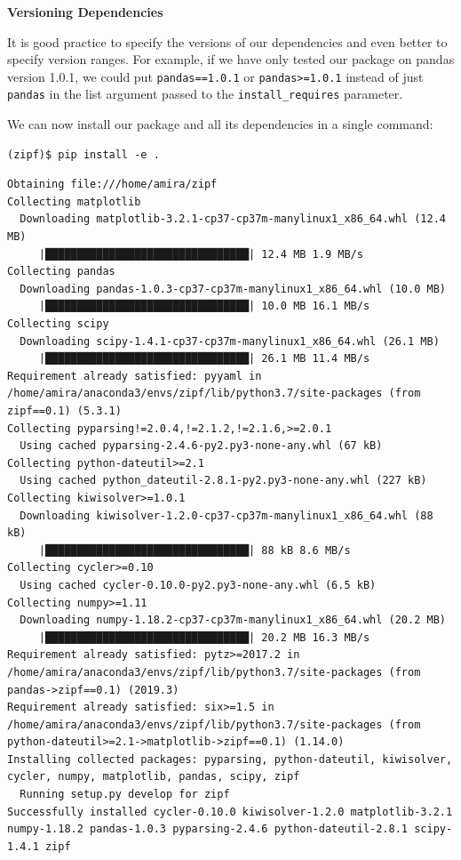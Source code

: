 \documentclass[
]{krantz}
\renewenvironment{quote}{\begin{VF}}{\end{VF}}
\begin{document}
\begin{quote}
\textbf{Versioning Dependencies}

It is good practice to specify the versions of our dependencies
and even better to specify version ranges.
For example, if we have only tested our package on pandas version 1.0.1,
we could put \texttt{pandas==1.0.1} or \texttt{pandas\textgreater{}=1.0.1} instead of just \texttt{pandas}
in the list argument passed to the \texttt{install\_requires} parameter.
\end{quote}

We can now install our package and all its dependencies in a single command:

\begin{verbatim}
(zipf)$ pip install -e .
\end{verbatim}

\begin{verbatim}
Obtaining file:///home/amira/zipf
Collecting matplotlib
  Downloading matplotlib-3.2.1-cp37-cp37m-manylinux1_x86_64.whl (12.4 MB)
     |████████████████████████████████| 12.4 MB 1.9 MB/s
Collecting pandas
  Downloading pandas-1.0.3-cp37-cp37m-manylinux1_x86_64.whl (10.0 MB)
     |████████████████████████████████| 10.0 MB 16.1 MB/s
Collecting scipy
  Downloading scipy-1.4.1-cp37-cp37m-manylinux1_x86_64.whl (26.1 MB)
     |████████████████████████████████| 26.1 MB 11.4 MB/s
Requirement already satisfied: pyyaml in /home/amira/anaconda3/envs/zipf/lib/python3.7/site-packages (from zipf==0.1) (5.3.1)
Collecting pyparsing!=2.0.4,!=2.1.2,!=2.1.6,>=2.0.1
  Using cached pyparsing-2.4.6-py2.py3-none-any.whl (67 kB)
Collecting python-dateutil>=2.1
  Using cached python_dateutil-2.8.1-py2.py3-none-any.whl (227 kB)
Collecting kiwisolver>=1.0.1
  Downloading kiwisolver-1.2.0-cp37-cp37m-manylinux1_x86_64.whl (88 kB)
     |████████████████████████████████| 88 kB 8.6 MB/s
Collecting cycler>=0.10
  Using cached cycler-0.10.0-py2.py3-none-any.whl (6.5 kB)
Collecting numpy>=1.11
  Downloading numpy-1.18.2-cp37-cp37m-manylinux1_x86_64.whl (20.2 MB)
     |████████████████████████████████| 20.2 MB 16.3 MB/s
Requirement already satisfied: pytz>=2017.2 in /home/amira/anaconda3/envs/zipf/lib/python3.7/site-packages (from pandas->zipf==0.1) (2019.3)
Requirement already satisfied: six>=1.5 in /home/amira/anaconda3/envs/zipf/lib/python3.7/site-packages (from python-dateutil>=2.1->matplotlib->zipf==0.1) (1.14.0)
Installing collected packages: pyparsing, python-dateutil, kiwisolver, cycler, numpy, matplotlib, pandas, scipy, zipf
  Running setup.py develop for zipf
Successfully installed cycler-0.10.0 kiwisolver-1.2.0 matplotlib-3.2.1 numpy-1.18.2 pandas-1.0.3 pyparsing-2.4.6 python-dateutil-2.8.1 scipy-1.4.1 zipf
\end{verbatim}
\end{document}
